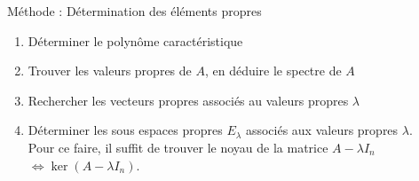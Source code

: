 \begin{bclogo}[logo=\bclampe,arrondi=0.1,ombre=true, couleur=yellow!60,couleurBord=yellow]{Méthode : Détermination des éléments propres}
\begin{enumerate}
    \item Déterminer le polynôme caractéristique
    \item Trouver les valeurs propres de $A$, en déduire le spectre de $A$
    \item Rechercher les vecteurs propres associés au valeurs propres $\lambda$
    \item Déterminer les sous espaces propres $E_{\lambda}$ associés aux valeurs propres $\lambda$.\\
    Pour ce faire, il suffit de trouver le noyau de la matrice $A-\lambda I_n$ $\Leftrightarrow \ker(A-\lambda I_n)$.\\
\end{enumerate}
\end{bclogo}
